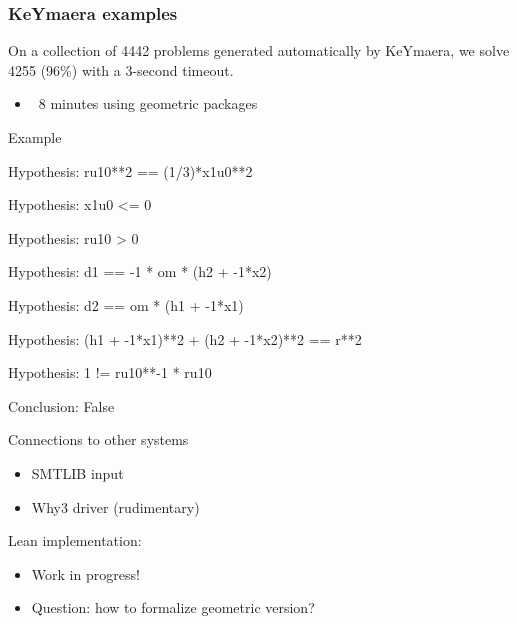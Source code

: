 \documentclass{beamer}
\begin{document}
\begin{frame}
 \frametitle{KeYmaera examples}
 On a collection of 4442 problems generated automatically by KeYmaera, we solve 4255 (96\%) with a 3-second timeout.
 \begin{itemize}
  \item ~8 minutes using geometric packages
 \end{itemize}

 \begin{block}{Example}
  \tt{Hypothesis: ru10**2 == (1/3)*x1u0**2

  Hypothesis: x1u0 <= 0

  Hypothesis: ru10 > 0

  Hypothesis: d1 == -1 * om * (h2 + -1*x2)

  Hypothesis: d2 == om * (h1 + -1*x1)

  Hypothesis: (h1 + -1*x1)**2 + (h2 + -1*x2)**2 == r**2

  Hypothesis: 1 != ru10**-1 * ru10

  Conclusion: False}
 \end{block}

\end{frame}

\begin{frame}{Connections to other systems}
 \begin{itemize}
  \item SMTLIB input
  \item Why3 driver (rudimentary)
 \end{itemize}

\vspace{.5cm}

Lean implementation:
\begin{itemize}
\item Work in progress!
\item Question: how to formalize geometric version?
\end{itemize}
\end{frame}

\end{document}
